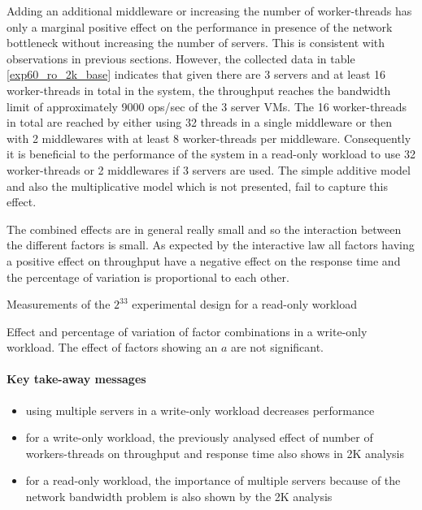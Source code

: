 \documentclass[report.tex]{subfiles}
\begin{document}
Adding an additional middleware or increasing the number of worker-threads has only a marginal positive effect on the performance in presence of the network bottleneck without increasing the number of servers. This is consistent with observations in previous sections. 
However, the collected data in table \ref{exp60_ro_2k_base} indicates that given there are 3 servers and at least 16 worker-threads in total in the system, the throughput reaches the bandwidth limit of approximately 9000 ops/sec of the 3 server VMs. The 16 worker-threads in total are reached by either using 32 threads in a single middleware or then with 2 middlewares with at least 8 worker-threads per middleware.
Consequently it is beneficial to the performance of the system in a read-only workload to use 32 worker-threads or 2 middlewares if 3 servers are used.
The simple additive model and also the multiplicative model which is not presented, fail to capture this effect.

The combined effects are in general really small and so the interaction between the different factors is small.
As expected by the interactive law all factors having a positive effect on throughput have a negative effect on the response time and the percentage of variation is proportional to each other.



\begin{table}[H]
	\centering
	\small{
		\setlength{\tabcolsep}{4.7pt}
		
		\caption{Measurements of the $2^33$ experimental design for a read-only workload}\label{exp60_ro_2k_base} 
	}
\end{table}

\begin{table}[H]
	\small{
		\centering
		\setlength{\tabcolsep}{4.5pt}
		\newcommand{\rlft}[0]{\raggedleft\arraybackslash}
		
		\caption{Effect and percentage of variation of factor combinations in a write-only workload. The effect of factors showing an $a$ are not significant.}\label{exp60_ro_2k_effect}
	}
\end{table}


\paragraph{Key take-away messages}
\begin{itemize}
	\vitemsep
	\item using multiple servers in a write-only workload decreases performance
	\item for a write-only workload, the previously analysed effect of number of workers-threads on throughput and response time also  shows in 2K analysis
	\item for a read-only workload, the importance of multiple servers because of the network bandwidth problem is also shown by the 2K analysis 
\end{itemize}
\end{document}

